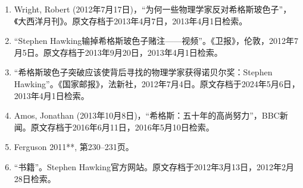 \begin{enumerate}
\item Wright, Robert (2012年7月17日)，“为何一些物理学家反对希格斯玻色子”，《大西洋月刊》。原文存档于2013年4月7日，2013年4月1日检索。  
\item “Stephen Hawking输掉希格斯玻色子赌注——视频”。《卫报》，伦敦，2012年7月5日。原文存档于2013年9月20日，2013年4月1日检索。  
\item “希格斯玻色子突破应该使背后寻找的物理学家获得诺贝尔奖：Stephen Hawking”。《国家邮报》，法新社，2012年7月4日。原文存档于2024年5月6日，2013年4月1日检索。  
\item Amos, Jonathan (2013年10月8日)，“希格斯：五十年的高尚努力”，BBC新闻。原文存档于2016年6月11日，2016年5月10日检索。  
\item Ferguson 2011**, 第230–231页。  
\item “书籍”。Stephen Hawking官方网站。原文存档于2012年3月13日，2012年2月28日检索。
\end{enumerate}